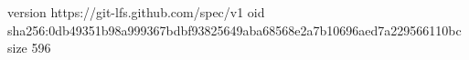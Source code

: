 version https://git-lfs.github.com/spec/v1
oid sha256:0db49351b98a999367bdbf93825649aba68568e2a7b10696aed7a229566110bc
size 596
